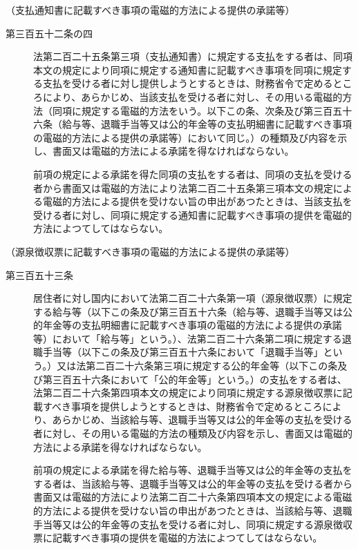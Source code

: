 \documentclass[twocolumn,a4j,10pt]{ltjtarticle}
\begin{document}
\noindent\hspace{10pt}（支払通知書に記載すべき事項の電磁的方法による提供の承諾等）
\begin{description}
\item[第三百五十二条の四]法第二百二十五条第三項（支払通知書）に規定する支払をする者は、同項本文の規定により同項に規定する通知書に記載すべき事項を同項に規定する支払を受ける者に対し提供しようとするときは、財務省令で定めるところにより、あらかじめ、当該支払を受ける者に対し、その用いる電磁的方法（同項に規定する電磁的方法をいう。以下この条、次条及び第三百五十六条（給与等、退職手当等又は公的年金等の支払明細書に記載すべき事項の電磁的方法による提供の承諾等）において同じ。）の種類及び内容を示し、書面又は電磁的方法による承諾を得なければならない。
\item[]前項の規定による承諾を得た同項の支払をする者は、同項の支払を受ける者から書面又は電磁的方法により法第二百二十五条第三項本文の規定による電磁的方法による提供を受けない旨の申出があつたときは、当該支払を受ける者に対し、同項に規定する通知書に記載すべき事項の提供を電磁的方法によつてしてはならない。
\end{description}
\noindent\hspace{10pt}（源泉徴収票に記載すべき事項の電磁的方法による提供の承諾等）
\begin{description}
\item[第三百五十三条]居住者に対し国内において法第二百二十六条第一項（源泉徴収票）に規定する給与等（以下この条及び第三百五十六条（給与等、退職手当等又は公的年金等の支払明細書に記載すべき事項の電磁的方法による提供の承諾等）において「給与等」という。）、法第二百二十六条第二項に規定する退職手当等（以下この条及び第三百五十六条において「退職手当等」という。）又は法第二百二十六条第三項に規定する公的年金等（以下この条及び第三百五十六条において「公的年金等」という。）の支払をする者は、法第二百二十六条第四項本文の規定により同項に規定する源泉徴収票に記載すべき事項を提供しようとするときは、財務省令で定めるところにより、あらかじめ、当該給与等、退職手当等又は公的年金等の支払を受ける者に対し、その用いる電磁的方法の種類及び内容を示し、書面又は電磁的方法による承諾を得なければならない。
\item[]前項の規定による承諾を得た給与等、退職手当等又は公的年金等の支払をする者は、当該給与等、退職手当等又は公的年金等の支払を受ける者から書面又は電磁的方法により法第二百二十六条第四項本文の規定による電磁的方法による提供を受けない旨の申出があつたときは、当該給与等、退職手当等又は公的年金等の支払を受ける者に対し、同項に規定する源泉徴収票に記載すべき事項の提供を電磁的方法によつてしてはならない。
\end{description}
\end{document}
